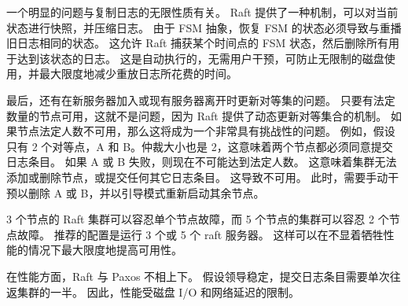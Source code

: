 		一个明显的问题与复制日志的无限性质有关。 
		Raft 提供了一种机制，可以对当前状态进行快照，并压缩日志。 
		由于 FSM 抽象，恢复 FSM 的状态必须导致与重播旧日志相同的状态。 
		这允许 Raft 捕获某个时间点的 FSM 状态，然后删除所有用于达到该状态的日志。 
		这是自动执行的，无需用户干预，可防止无限制的磁盘使用，并最大限度地减少重放日志所花费的时间。
		
		最后，还有在新服务器加入或现有服务器离开时更新对等集的问题。 
		只要有法定数量的节点可用，这就不是问题，因为 Raft 提供了动态更新对等集合的机制。 
		如果节点法定人数不可用，那么这将成为一个非常具有挑战性的问题。 
		例如，假设只有 2 个对等点，A 和 B。仲裁大小也是 2，这意味着两个节点都必须同意提交日志条目。 
		如果 A 或 B 失败，则现在不可能达到法定人数。 
		这意味着集群无法添加或删除节点，或提交任何其它日志条目。 
		这导致不可用。 此时，需要手动干预以删除 A 或 B，并以引导模式重新启动其余节点。
		
		3 个节点的 Raft 集群可以容忍单个节点故障，而 5 个节点的集群可以容忍 2 个节点故障。 
		推荐的配置是运行 3 个或 5 个 raft 服务器。 这样可以在不显着牺牲性能的情况下最大限度地提高可用性。
		
		在性能方面，Raft 与 Paxos 不相上下。 
		假设领导稳定，提交日志条目需要单次往返集群的一半。 
		因此，性能受磁盘 I/O 和网络延迟的限制。
	
	
	
			
		
	
	\clearpage
	
	
